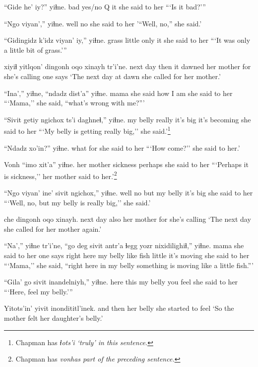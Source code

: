 \documentclass[12pt]{article}
\begin{document}
\gll ``Gide he' iy?'' yiɬne.
bad {yes/no Q} it {she said to her}
\glt ```Is it bad?'''
\glend

\gll ``Ngo viyan','' yiɬne.
well no {she said to her}
\glt '``Well, no,'' she said.'
\glend

\gll ``Gidingidz k'idz viyan' iy,'' yiɬne.
grass  little only it {she said to her}
\glt ```It was only a little bit of grass.'''
\glend

 xiyiɬ yitlqon' dingonh oqo xinayh tr'i'ne.
{next day} then {it dawned} {her mother} for {she's calling} {one says}
\glt `The next day at dawn she called for her mother.'
\glend

\gll ``Ina','' yiɬne, ``ndadz dist'a'' yiɬne.
mama  {she said} how  {I am}  {she said to her}
\glt ```Mama,'' she said, ``what's wrong with me?'''
\glend

\gll ``Sivit getiy ngichox ts'i daghneɬ,'' yiɬne.
{my belly} really {it's big} {}  {it's becoming} {she said to her}
\glt ```My belly is getting really big,'' she said.'\footnote{Chapman has \em ɬots'i \em `truly' in this sentence.}
\glend

\gll ``Ndadz xo'in?'' yiɬne.
what for {she said to her}
\glt ```How come?''  she said to her.'
\glend

\gll Vonh  ``imo  xit'a'' yiɬne.
{her mother} sickness perhaps {she said to her}
\glt ```Perhaps it is sickness,'' her mother said to her.'\footnote{Chapman has \em vonh\em as part of the preceding sentence.}
\glend

\gll ``Ngo viyan' ine' sivit ngichox,'' yiɬne.
well no but {my belly} {it's big} {she said to her}
\glt ```Well, no, but my belly is really big,'' she said.'
\glend

 che dingonh oqo xinayh.
{next day} also {her mother} for {she's calling}
\glt `The next day she called for her mother again.'
\glend

\gll ``Na','' yiɬne  tr'i'ne, {``go deg} sivit antr'a ɬegg yozr nixidilighiɬ,'' yiɬne.
mama {she said to her} {one says} {right here} {my belly} like fish little {it's moving} {she said to her}
\glt ```Mama,'' she said, ``right here in my belly something is moving like a little fish.''' 
\glend

\gll ``Gila' go sivit  inandelniyh,''  yiɬne.
here this {my belly} {you feel} {she said to her}
\glt ```Here, feel my belly.'''
\glend

\gll Yitots'in' yivit  inondititl'inek.
{and then} {her belly} {she started to feel}
\glt `So the mother felt her daughter's belly.'
\glend
\end{document}
